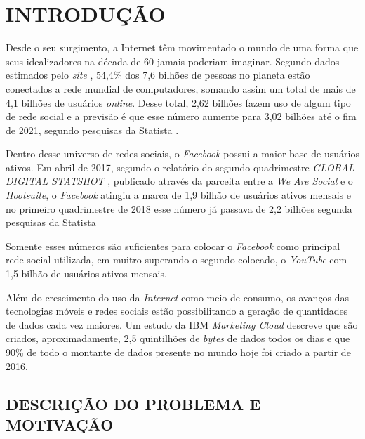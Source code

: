 
%

\chapter{INTRODUÇÃO}
\label{chap:introducao}

Desde o seu surgimento, a Internet têm movimentado o mundo de uma forma que seus idealizadores na década de 60 jamais poderiam imaginar. Segundo dados estimados pelo \textit{site} , 54,4\% dos 7,6 bilhões de pessoas no planeta estão conectados a rede mundial de computadores, somando assim um total de mais de 4,1 bilhões de usuários \textit{online}. Desse total, 2,62 bilhões fazem uso de algum tipo de rede social e a previsão é que esse número aumente para 3,02 bilhões até o fim de 2021, segundo pesquisas da Statista .

Dentro desse universo de redes sociais, o \textit{Facebook} possui a maior base de usuários ativos. Em abril de 2017, segundo o relatório do segundo quadrimestre \textit{GLOBAL DIGITAL STATSHOT} , publicado através da parceita entre a \textit{We Are Social} e o \textit{Hootsuite}, o \textit{Facebook} atingiu a marca de 1,9 bilhão de usuários ativos mensais e no primeiro quadrimestre de 2018 esse número já passava de 2,2 bilhões segunda pesquisas da Statista 


Somente esses números são suficientes para colocar o \textit{Facebook} como principal rede social utilizada, em muitro superando o segundo colocado, o \textit{YouTube} com 1,5 bilhão de usuários ativos mensais. 

Além do crescimento do uso da \textit{Internet} como meio de consumo, os avanços das tecnologias móveis e redes sociais estão possibilitando a geração de quantidades de dados cada vez maiores. Um estudo da IBM \textit{Marketing Cloud}  descreve que são criados, aproximadamente, 2,5 quintilhões de \textit{bytes} de dados todos os dias e que 90\% de todo o montante de dados presente no mundo hoje foi criado a partir de 2016.

\section{DESCRIÇÃO DO PROBLEMA E MOTIVAÇÃO}
\label{sec:descricaomotivacao}

